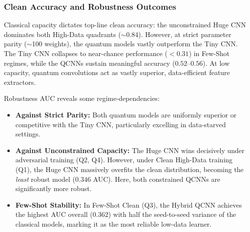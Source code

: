 \subsubsection{Clean Accuracy and Robustness Outcomes}

Classical capacity dictates top-line clean accuracy: the unconstrained Huge CNN dominates both High-Data quadrants ($\sim$0.84). However, at strict parameter parity ($\sim$100 weights), the quantum models vastly outperform the Tiny CNN. The Tiny CNN collapses to near-chance performance ($<0.31$) in Few-Shot regimes, while the QCNNs sustain meaningful accuracy ($0.52$--$0.56$). At low capacity, quantum convolutions act as vastly superior, data-efficient feature extractors.

Robustness AUC reveals some regime-dependencies:
\begin{itemize}
    \item \textbf{Against Strict Parity:} Both quantum models are uniformly superior or competitive with the Tiny CNN, particularly excelling in data-starved settings.
    \item \textbf{Against Unconstrained Capacity:} The Huge CNN wins decisively under adversarial training (Q2, Q4). However, under Clean High-Data training (Q1), the Huge CNN massively overfits the clean distribution, becoming the \emph{least} robust model ($0.346$ AUC). Here, both constrained QCNNs are significantly more robust.
    \item \textbf{Few-Shot Stability:} In Few-Shot Clean (Q3), the Hybrid QCNN achieves the highest AUC overall ($0.362$) with half the seed-to-seed variance of the classical models, marking it as the most reliable low-data learner.
\end{itemize}

